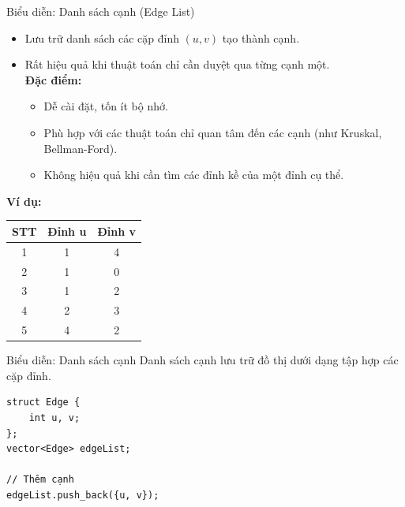 \documentclass{beamer}
\begin{document}
\begin{frame}{Biểu diễn: Danh sách cạnh (Edge List)}
\begin{itemize}
    \item Lưu trữ danh sách các cặp đỉnh $(u, v)$ tạo thành cạnh.
    \item Rất hiệu quả khi thuật toán chỉ cần duyệt qua từng cạnh một.\\
    \textbf{Đặc điểm:}
    \begin{itemize}
        \item Dễ cài đặt, tốn ít bộ nhớ.
        \item Phù hợp với các thuật toán chỉ quan tâm đến các cạnh (như Kruskal, Bellman-Ford).
        \item Không hiệu quả khi cần tìm các đỉnh kề của một đỉnh cụ thể.
    \end{itemize}
\end{itemize}
\vspace{0.5cm}
\centering
\textbf{Ví dụ:}
\begin{table}[]
    \centering
    \begin{tabular}{|c|c|c|}
        \hline
        \textbf{STT} & \textbf{Đỉnh u} & \textbf{Đỉnh v} \\ \hline
        1 & 1 & 4 \\ \hline
        2 & 1 & 0 \\ \hline
        3 & 1 & 2 \\ \hline
        4 & 2 & 3 \\ \hline
        5 & 4 & 2 \\ \hline
    \end{tabular}
\end{table}
\end{frame}

\begin{frame}[fragile]{Biểu diễn: Danh sách cạnh}
    Danh sách cạnh lưu trữ đồ thị dưới dạng tập hợp các cặp đỉnh.
    \begin{verbatim}
struct Edge {
    int u, v;
};
vector<Edge> edgeList;

// Thêm cạnh
edgeList.push_back({u, v});
    \end{verbatim}
\end{frame}
\end{document}
